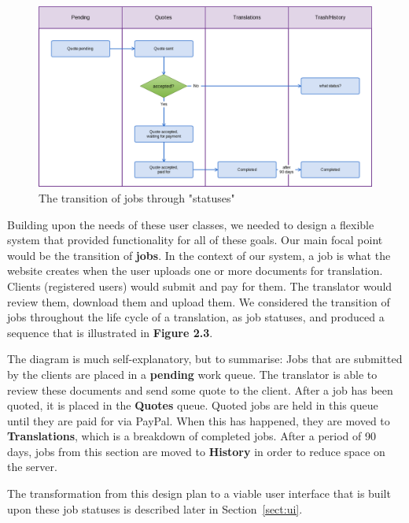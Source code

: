 \documentclass{l3proj}
\begin{document}
\begin{figure}[h]
\label{fig:jobstatuses}
\centering
\includegraphics[width=\linewidth]{jobstatuses}
\caption{The transition of jobs through "statuses"}
\end{figure}

Building upon the needs of these user classes, we needed to design a flexible
system that provided functionality for all of these goals. Our main focal point
would be the transition of \textbf{jobs}. In the context of our system, a job is
what the website creates when the user uploads one or more documents for
translation. Clients (registered users) would submit and pay for them. The
translator would review them, download them and upload them. We considered the
transition of jobs throughout the life cycle of a translation, as job statuses,
and produced a sequence that is illustrated in \textbf{Figure 2.3}. \newline

The diagram is much self-explanatory, but to summarise: Jobs that are submitted
by the clients are placed in a \textbf{pending} work queue. The translator is
able to review these documents and send some quote to the client. After a job
has been quoted, it is placed in the \textbf{Quotes} queue. Quoted jobs are held
in this queue until they are paid for via PayPal. When this has happened, they
are moved to \textbf{Translations}, which is a breakdown of completed jobs.
After a period of 90 days, jobs from this section are moved to \textbf{History}
in order to reduce space on the server.

The transformation from this design plan to a viable user interface that is
built upon these job statuses is described later in Section~\ref{sect:ui}.
\newline
\end{document}
